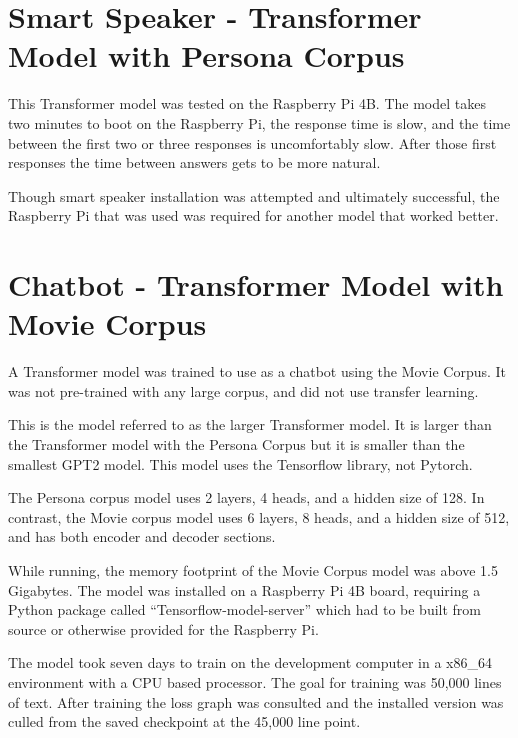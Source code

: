 \section{Smart Speaker - Transformer Model with Persona Corpus}

This Transformer model was tested on the Raspberry Pi 4B. The model takes two minutes to boot on the Raspberry Pi, the response time is slow, and the time between the first two or three responses is uncomfortably slow. After those first responses the time between answers gets to be more natural.

Though smart speaker installation was attempted and ultimately successful, the Raspberry Pi that was used was required for another model that worked better. %

\section{Chatbot - Transformer Model with Movie Corpus}

\label{transformer-movie-corpus}
A Transformer model was trained to use as a chatbot using the Movie Corpus. It was not pre-trained with any large corpus, and did not use transfer learning. 

This is the model referred to as the larger Transformer model. It is larger than the Transformer model with the Persona Corpus but it is smaller than the smallest GPT2 model. This model uses the Tensorflow library, not Pytorch. 

The Persona corpus model uses 2 layers, 4 heads, and a hidden size of 128. In contrast, the Movie corpus model uses 6 layers, 8 heads, and a hidden size of 512, and has both encoder and decoder sections.

While running, the memory footprint of the Movie Corpus model was above 1.5 Gigabytes. The model was installed on a Raspberry Pi 4B board, requiring a Python package called ``Tensorflow-model-server'' which had to be built from source or otherwise provided for the Raspberry Pi. 

The model took seven days to train on the development computer in a x86\_64 environment with a CPU based processor. The goal for training was 50,000 lines of text. After training the loss graph was consulted and the installed version was culled from the saved checkpoint at the 45,000 line point.


